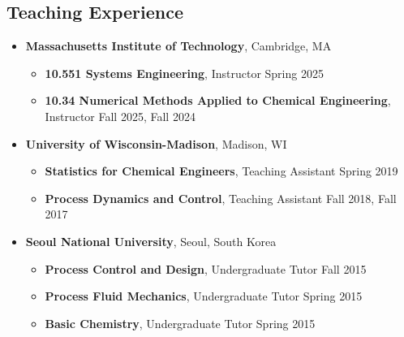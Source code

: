 \subsection*{Teaching Experience}
\begin{itemize}[itemsep=1pt, parsep=0pt,leftmargin=*]
\item[] \textbf{Massachusetts Institute of Technology}, Cambridge, MA
  \begin{itemize}[leftmargin=*,itemsep=0pt]
  \item[] \textbf{10.551 Systems Engineering}, Instructor \hfill Spring 2025
  \item[] \textbf{10.34 Numerical Methods Applied to Chemical Engineering}, Instructor \hfill Fall 2025, Fall 2024
  \end{itemize}
\item[] \textbf{University of Wisconsin-Madison}, Madison, WI
  \begin{itemize}[leftmargin=*,itemsep=0pt]
  \item[] \textbf{Statistics for Chemical Engineers}, Teaching Assistant \hfill Spring 2019
  \item[] \textbf{Process Dynamics and Control}, Teaching Assistant \hfill  Fall 2018, Fall 2017
  \end{itemize}
\item[] \textbf{Seoul National University}, Seoul, South Korea
  \begin{itemize}[leftmargin=*,itemsep=0pt]
  \item[] \textbf{Process Control and Design}, Undergraduate Tutor \hfill  Fall 2015
  \item[] \textbf{Process Fluid Mechanics}, Undergraduate Tutor \hfill Spring 2015
  \item[] \textbf{Basic Chemistry}, Undergraduate Tutor \hfill Spring 2015
  \end{itemize}
\end{itemize}

